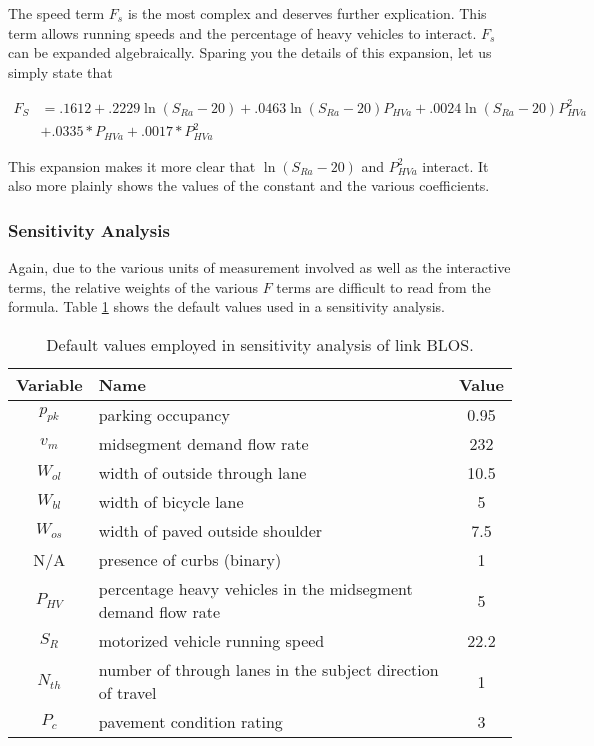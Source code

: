 \documentclass[11pt]{article} %
\begin{document}
The speed term $F_s$ is the most complex and deserves further explication. This term allows running speeds and the percentage of heavy vehicles to interact. $F_s$ can be expanded algebraically. Sparing you the details of this expansion, let us simply state that

\begin{align*}
F_S &= .1612+ .2229 \ln (S_{Ra}-20) + .0463 \ln (S_{Ra}-20) P_{HVa} + .0024\ln (S_{Ra}-20)P_{HVa}^2 \\
&       + .0335*P_{HVa} + .0017*P_{HVa}^2
\end{align*}

This expansion makes it more clear that $\ln (S_{Ra}-20)$ and $P_{HVa}^2$ interact. It also more plainly shows the values of the constant and the various coefficients.


\subsubsection{Sensitivity Analysis}
Again, due to the various units of measurement involved as well as the interactive terms, the relative weights of the various $F$ terms are difficult to read from the formula. Table \ref{table:BLOS_link_sens_default} shows the default values used in a sensitivity analysis.


\begin{table}[h!]
\centering
\begin{tabular}{|c|l|c|}
\hline
Variable & Name  & Value \\
\hline
$p_{pk}$ & parking occupancy & 0.95 \\
\hline
$v_m$ & midsegment demand flow rate & 232 \\
\hline
$W_{ol}$ & width of outside through lane & 10.5 \\
\hline
$W_{bl}$ & width of bicycle lane & 5 \\
\hline
$W_{os}$ & width of paved outside shoulder & 7.5 \\
\hline
N/A   & presence of curbs (binary) & 1 \\
\hline
$P_{HV}$ & percentage heavy vehicles in the midsegment demand flow rate & 5 \\
\hline
$S_R$ & motorized vehicle running speed & 22.2 \\
\hline
$N_{th}$ & number of through lanes in the subject direction of travel & 1 \\
\hline
$P_c$ & pavement condition rating & 3 \\
\hline
\end{tabular}
\caption{Default values employed in sensitivity analysis of link BLOS.}
\label{table:BLOS_link_sens_default}
\end{table}
\vspace{.25in}
\end{document}
